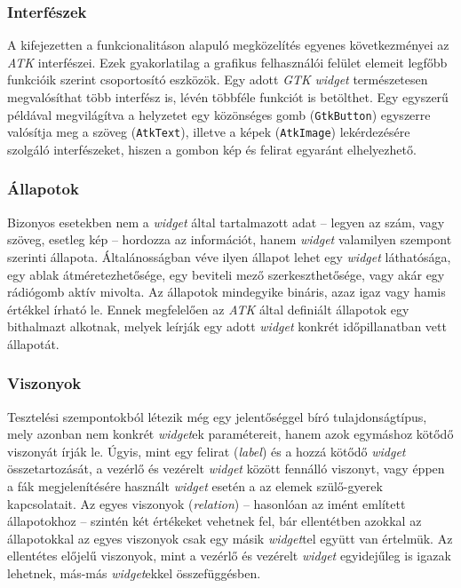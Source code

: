 \subsubsection{Interfészek}

A kifejezetten a funkcionalitáson alapuló megközelítés egyenes következményei az \textit{ATK} interfészei. Ezek gyakorlatilag a grafikus felhasználói felület elemeit legfőbb funkcióik szerint csoportosító eszközök. Egy adott \textit{GTK} \textit{widget} természetesen megvalósíthat több interfész is, lévén többféle funkciót is betölthet. Egy egyszerű példával megvilágítva a helyzetet egy közönséges gomb (\texttt{GtkButton}) egyszerre valósítja meg a szöveg (\texttt{AtkText}), illetve a képek (\texttt{AtkImage}) lekérdezésére szolgáló interfészeket, hiszen a gombon kép és felirat egyaránt elhelyezhető.

\subsubsection{Állapotok}

Bizonyos esetekben nem a \textit{widget} által tartalmazott adat -- legyen az szám, vagy szöveg, esetleg kép -- hordozza az információt, hanem \textit{widget} valamilyen szempont szerinti állapota. Általánosságban véve ilyen állapot lehet egy \textit{widget} láthatósága, egy ablak átméretezhetősége, egy beviteli mező szerkeszthetősége, vagy akár egy rádiógomb aktív mivolta. Az állapotok mindegyike bináris, azaz igaz vagy hamis értékkel írható le. Ennek megfelelően az \textit{ATK} által definiált állapotok egy bithalmazt alkotnak, melyek leírják egy adott \textit{widget} konkrét időpillanatban vett állapotát.

\subsubsection{Viszonyok}

Tesztelési szempontokból létezik még egy jelentőséggel bíró tulajdonságtípus, mely azonban nem konkrét \textit{widget}ek paramétereit, hanem azok egymáshoz kötődő viszonyát írják le. Úgyis, mint egy felirat (\textit{label}) és a hozzá kötődő \textit{widget} összetartozását, a vezérlő és vezérelt \textit{widget} között fennálló viszonyt, vagy éppen a fák megjelenítésére használt \textit{widget} esetén a az elemek szülő-gyerek kapcsolatait. Az egyes viszonyok (\textit{relation}) -- hasonlóan az imént említett állapotokhoz -- szintén két értékeket vehetnek fel, bár ellentétben azokkal az állapotokkal az egyes viszonyok csak egy másik \textit{widget}tel együtt van értelmük. Az ellentétes előjelű viszonyok, mint a vezérlő és vezérelt \textit{widget} egyidejűleg is igazak lehetnek, más-más \textit{widget}ekkel összefüggésben.

